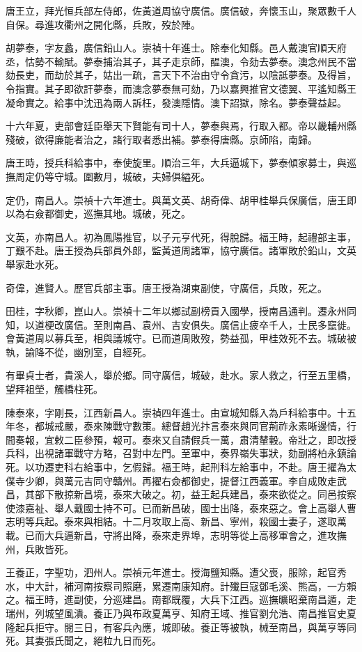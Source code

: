 \begin{pinyinscope}
唐王立，拜光恒兵部左侍郎，佐黃道周協守廣信。廣信破，奔懷玉山，聚眾數千人自保。尋進攻衢州之開化縣，兵敗，歿於陣。

胡夢泰，字友蠡，廣信鉛山人。崇禎十年進士。除奉化知縣。邑人戴澳官順天府丞，怙勢不輸賦。夢泰捕治其子，其子走京師，醖澳，令劾去夢泰。澳念州民不當劾長吏，而劫於其子，姑出一疏，言天下不治由守令貪污，以陰詆夢泰。及得旨，令指實。其子即欲訐夢泰，而澳念夢泰無可劾，乃以嘉興推官文德翼、平遙知縣王凝命實之。給事中沈迅為兩人訴枉，發澳隱情。澳下詔獄，除名。夢泰聲益起。

十六年夏，吏部會廷臣舉天下賢能有司十人，夢泰與焉，行取入都。帝以畿輔州縣殘破，欲得廉能者治之，諸行取者悉出補。夢泰得唐縣。京師陷，南歸。

唐王時，授兵科給事中，奉使旋里。順治三年，大兵逼城下，夢泰傾家募士，與巡撫周定仍等守城。圍數月，城破，夫婦俱縊死。

定仍，南昌人。崇禎十六年進士。與萬文英、胡奇偉、胡甲桂舉兵保廣信，唐王即以為右僉都御史，巡撫其地。城破，死之。

文英，亦南昌人。初為鳳陽推官，以子元亨代死，得脫歸。福王時，起禮部主事，丁艱不赴。唐王授為兵部員外郎，監黃道周諸軍，協守廣信。諸軍敗於鉛山，文英舉家赴水死。

奇偉，進賢人。歷官兵部主事。唐王授為湖東副使，守廣信，兵敗，死之。

田桂，字秋卿，崑山人。崇禎十二年以鄉試副榜貢入國學，授南昌通判。遷永州同知，以道梗改廣信。至則南昌、袁州、吉安俱失。廣信止疲卒千人，士民多竄徙。會黃道周以募兵至，相與議城守。已而道周敗歿，勢益孤，甲桂效死不去。城破被執，諭降不從，幽別室，自經死。

有畢貞士者，貴溪人，舉於鄉。同守廣信，城破，赴水。家人救之，行至五里橋，望拜祖塋，觸橋柱死。

陳泰來，字剛長，江西新昌人。崇禎四年進士。由宣城知縣入為戶科給事中。十五年冬，都城戒嚴，泰來陳戰守數策。總督趙光抃言泰來與同官荊祚永素晰邊情，行間奏報，宜敕二臣參預，報可。泰來又自請假兵一萬，肅清輦轂。帝壯之，即改授兵科，出視諸軍戰守方略，召對中左門。至軍中，奏界嶺失事狀，劾副將柏永鎮論死。以功遷吏科右給事中，乞假歸。福王時，起刑科左給事中，不赴。唐王擢為太僕寺少卿，與萬元吉同守贛州。再擢右僉都御史，提督江西義軍。李自成敗走武昌，其部下散掠新昌境，泰來大破之。初，益王起兵建昌，泰來欲從之。同邑按察使漆嘉祉、舉人戴國士持不可。已而新昌破，國士出降，泰來惡之。會上高舉人曹志明等兵起。泰來與相結。十二月攻取上高、新昌、寧州，殺國士妻子，遂取萬載。已而大兵逼新昌，守將出降，泰來走界埠，志明等從上高移軍會之，進攻撫州，兵敗皆死。

王養正，字聖功，泗州人。崇禎元年進士。授海鹽知縣。遭父喪，服除，起官秀水，中大計，補河南按察司照磨，累遷南康知府。計殲巨寇鄧毛溪、熊高，一方賴之。福王時，進副使，分巡建昌。南都既覆，大兵下江西。巡撫曠昭棄南昌遁，走瑞州，列城望風潰。養正乃與布政夏萬亨、知府王域、推官劉允浩、南昌推官史夏隆起兵拒守。閱三日，有客兵內應，城即破。養正等被執，械至南昌，與萬亨等同死。其妻張氏聞之，絕粒九日而死。


\end{pinyinscope}
